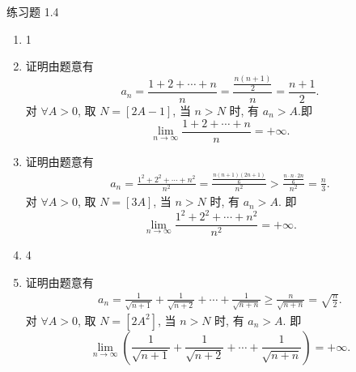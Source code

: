 


% 

\begin{center}
    {\heiti 练习题 1.4}
\end{center}

\begin{enumerate}
    \item 1
    \item %
        {\heiti 证明}\quad 由题意有
        \[
            a_n = \frac{1 + 2 + \cdots + n}{n} = \frac{\frac{n(n+1)}{2}}{n} = \frac{n + 1}{2}.    
        \]
        对 $\forall A > 0$, 取 $N = [2A - 1]$, 当 $n > N$ 时, 有 $a_n > A$.即
        \[
            \lim\limits_{n\to\infty}\dfrac{1 + 2 + \cdots + n}{n} = +\infty.
        \]
    \item %
        {\heiti 证明}\quad 由题意有
        \begin{align*}
            a_n = \frac{1^2 + 2^2 + \cdots + n^2}{n^2}
            = \frac{\frac{n(n+1)(2n+1)}{6}}{n^2} > \frac{\frac{n\cdot n\cdot 2n}{6}}{n^2}
            = \frac{n}{3}.
        \end{align*}
        对 $\forall A > 0$, 取 $N = [3A]$, 当 $n > N$ 时, 有 $a_n > A$. 即
        \[
            \lim\limits_{n\to\infty}\frac{1^2 + 2^2 + \cdots + n^2}{n^2} = +\infty.
        \]
    \item 4
    \item %
        {\heiti 证明}\quad 由题意有
        \begin{align*}
            a_n = \frac{1}{\sqrt{n+1}} + \frac{1}{\sqrt{n+2}} + \cdots + \frac{1}{\sqrt{n+n}} \geqslant \frac{n}{\sqrt{n+n}} = \sqrt{\frac{n}{2}}.
        \end{align*}
        对 $\forall A > 0$, 取 $N = [2A^2]$, 当 $n > N$ 时, 有 $a_n > A$. 即
        \[
            \lim\limits_{n\to\infty}\left(\frac{1}{\sqrt{n+1}} + \frac{1}{\sqrt{n+2}} + \cdots + \frac{1}{\sqrt{n+n}}\right) = +\infty.
        \]
\end{enumerate}

% 
